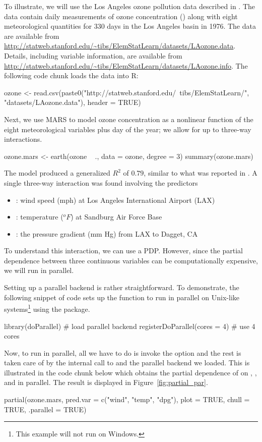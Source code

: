 To illustrate, we will use the Los Angeles ozone pollution data described in \citet{breiman-1985-estimating}. The data contain daily measurements of ozone concentration () along with eight meteorological quantities for 330 days in the Los Angeles basin in 1976. The data are available from \url{http://statweb.stanford.edu/~tibs/ElemStatLearn/datasets/LAozone.data}. Details, including variable information, are available from \url{http://statweb.stanford.edu/~tibs/ElemStatLearn/datasets/LAozone.info}. The following code chunk loads the data into R:
\begin{example}
ozone <- read.csv(paste0("http://statweb.stanford.edu/~tibs/ElemStatLearn/",
                         "datasets/LAozone.data"), header = TRUE)
\end{example}

Next, we use MARS to model ozone concentration as a nonlinear function of the eight meteorological variables plus day of the year; we allow for up to three-way interactions.
\begin{example}
ozone.mars <- earth(ozone ~ ., data = ozone, degree = 3)
summary(ozone.mars)
\end{example}
The model produced a generalized $R^2$ of $0.79$, similar to what was reported in \citet{breiman-1985-estimating}. A single three-way interaction was found involving the predictors
\begin{itemize}
  \item {}: wind speed (mph) at Los Angeles International Airport (LAX)
  \item {}: temperature ($^oF$) at Sandburg Air Force Base
  \item {}: the pressure gradient (mm Hg) from LAX to Dagget, CA
\end{itemize}
To understand this interaction, we can use a PDP. However, since the partial dependence between three continuous variables can be computationally expensive, we will run  in parallel.

Setting up a parallel backend is rather straightforward. To demonstrate, the following snippet of code sets up the  function to run in parallel on Unix-like systems\footnote{This example will not run on Windows.} using the  package.
\begin{example}
library(doParallel)  # load parallel backend
registerDoParallel(cores = 4)  # use 4 cores
\end{example}
Now, to run  in parallel, all we have to do is invoke the  option and the rest is taken care of by the internal call to  and the parallel backend we loaded. This is illustrated in the code chunk below which obtains the partial dependence of  on , , and  in parallel. The result is displayed in Figure~\ref{fig:partial_par}.
\begin{example}
partial(ozone.mars, pred.var = c("wind", "temp", "dpg"), plot = TRUE,
        chull = TRUE, .parallel = TRUE)
\end{example}

